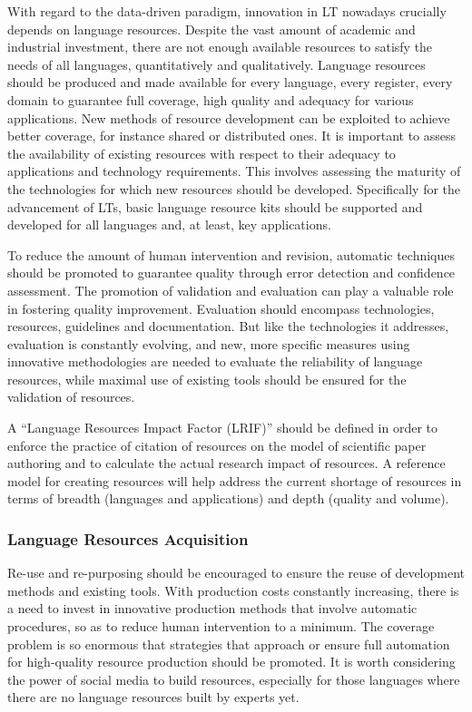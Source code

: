 \documentclass[10pt, plain]{../../metanetpaper}
\begin{document}
\begin{multicols}{2}
With regard to the data-driven paradigm, innovation in LT nowadays crucially depends on language resources. Despite the vast amount of academic and industrial investment, there are not enough available resources to satisfy the needs of all languages, quantitatively and qualitatively. Language resources should be produced and made available for every language, every register, every domain to guarantee full coverage, high quality and adequacy for various applications. New methods of resource development can be exploited to achieve better coverage, for instance shared or distributed ones. It is important to assess the availability of existing resources with respect to their adequacy to applications and technology requirements. This involves assessing the maturity of the technologies for which new resources should be developed. Specifically for the advancement of LTs, basic language resource kits should be supported and developed for all languages and, at least, key applications.

To reduce the amount of human intervention and revision, automatic techniques should be promoted to guarantee quality through error detection and confidence assessment. The promotion of validation and evaluation can play a valuable role in fostering quality improvement. Evaluation should encompass technologies, resources, guidelines and documentation. But like the technologies it addresses, evaluation is constantly evolving, and new, more specific measures using innovative methodologies are needed to evaluate the reliability of language resources, while maximal use of existing tools should be ensured for the validation of resources.

A “Language Resources Impact Factor (LRIF)” should be defined in order to enforce the practice of citation of resources on the model of scientific paper authoring and to calculate the actual research impact of resources.  A reference model for creating resources will help address the current shortage of resources in terms of breadth (languages and applications) and depth (quality and volume).

\subsubsection{Language Resources Acquisition}
\label{sec:lang-reso-acqu}

Re-use and re-purposing should be encouraged to ensure the reuse of development methods and existing tools. With production costs constantly increasing, there is a need to invest in innovative production methods that involve automatic procedures, so as to reduce human intervention to a minimum. The coverage problem is so enormous that strategies that approach or ensure full automation for high-quality resource production should be promoted. It is worth considering the power of social media to build resources, especially for those languages where there are no language resources built by experts yet.


\end{multicols}
\end{document}
